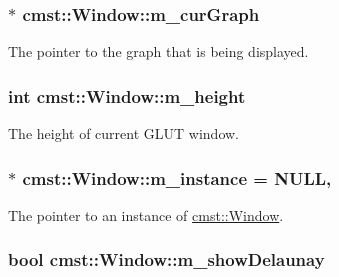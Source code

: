 \subsubsection[{\texorpdfstring{m\+\_\+cur\+Graph}{m_curGraph}}]{$\ast$ cmst\+::\+Window\+::m\+\_\+cur\+Graph\hspace{0.3cm}{\ttfamily [private]}}\hypertarget{classcmst_1_1_window_a86d6a605ac3dc593de030802009e73bc}{}\label{classcmst_1_1_window_a86d6a605ac3dc593de030802009e73bc}


The pointer to the graph that is being displayed. 

\subsubsection[{\texorpdfstring{m\+\_\+height}{m_height}}]{\setlength{\rightskip}{0pt plus 5cm}int cmst\+::\+Window\+::m\+\_\+height\hspace{0.3cm}{\ttfamily [private]}}\hypertarget{classcmst_1_1_window_a9447754382ddb8894d50a40d19f027a3}{}\label{classcmst_1_1_window_a9447754382ddb8894d50a40d19f027a3}


The height of current G\+L\+UT window. 

\subsubsection[{\texorpdfstring{m\+\_\+instance}{m_instance}}]{ $\ast$ cmst\+::\+Window\+::m\+\_\+instance = N\+U\+LL\hspace{0.3cm}{\ttfamily [static]}, {\ttfamily [private]}}\hypertarget{classcmst_1_1_window_a04ea9e382288b5d903542ee3f53b3617}{}\label{classcmst_1_1_window_a04ea9e382288b5d903542ee3f53b3617}


The pointer to an instance of \hyperlink{classcmst_1_1_window}{cmst\+::\+Window}. 

\subsubsection[{\texorpdfstring{m\+\_\+show\+Delaunay}{m_showDelaunay}}]{\setlength{\rightskip}{0pt plus 5cm}bool cmst\+::\+Window\+::m\+\_\+show\+Delaunay\hspace{0.3cm}{\ttfamily [private]}}\hypertarget{classcmst_1_1_window_a527a10c574abe1ad1e0279465b07a7f0}{}\label{classcmst_1_1_window_a527a10c574abe1ad1e0279465b07a7f0}


